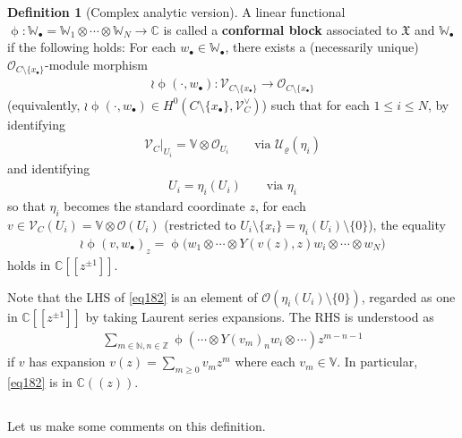 \documentclass[11pt,b5paper,notitlepage]{article}
\theoremstyle{definition}
\newtheorem{df}{Definition}[section]
\theoremstyle{plain}
\newcommand{\fk}{\mathfrak}
\newcommand{\mc}{\mathcal}
\newcommand{\scr}{\mathscr}
\newcommand{\blt}{\bullet}
\newcommand{\Vbb}{\mathbb V}
\newcommand{\Wbb}{\mathbb W}
\newcommand{\Cbb}{\mathbb C}
\newcommand{\Nbb}{\mathbb N}
\newcommand{\Zbb}{\mathbb Z}
\numberwithin{equation}{section}
\begin{document}
\begin{df}[Complex analytic version]\label{lb103}
A linear functional $\upphi:\Wbb_\blt=\Wbb_1\otimes\cdots\otimes\Wbb_N\rightarrow\Cbb$ is called a \textbf{conformal block} associated to $\fk X$ and $\Wbb_\blt$ if the following holds: For each $w_\blt\in\Wbb_\blt$, there exists a (necessarily unique) $\scr O_{C\setminus\{x_\blt\}}$-module morphism
\begin{align*}
\wr\upphi(\cdot,w_\blt):\scr V_{C\setminus\{x_\blt\}}\rightarrow\scr O_{C\setminus\{x_\blt\}}
\end{align*}
(equivalently,  $\wr\upphi(\cdot,w_\blt)\in H^0(C\setminus\{x_\blt\},\scr V_C^\vee)$) such that  for each $1\leq i\leq N$, by identifying
\begin{align}
\scr V_C|_{U_i}=\Vbb\otimes\scr O_{U_i}\qquad\text{via }\mc U_\varrho(\eta_i)\label{eq186}
\end{align}
and identifying
\begin{align}
U_i=\eta_i(U_i)\qquad\text{via }\eta_i	\label{eq187}
\end{align}
so that $\eta_i$ becomes the standard coordinate $z$, for each $v\in \scr V_C(U_i)=\Vbb\otimes\scr O(U_i)$ (restricted to $U_i\setminus\{x_i\}=\eta_i(U_i)\setminus\{0\}$), the equality
\begin{align}
\wr\upphi(v,w_\blt)_z=\upphi\big(w_1\otimes\cdots\otimes Y(v(z),z)w_i\otimes\cdots\otimes w_N\big) \label{eq182}
\end{align}
holds in $\Cbb[[z^{\pm1}]]$. \hfill\qedsymbol
\end{df}


Note that the LHS of \eqref{eq182} is an element of $\scr O(\eta_i(U_i)\setminus\{0\})$, regarded as one in $\Cbb[[z^{\pm1}]]$ by taking Laurent series expansions. The RHS is understood as
\begin{align*}
\sum_{m\in\Nbb,n\in\Zbb}\upphi(\cdots \otimes Y(v_m)_nw_i\otimes\cdots)z^{m-n-1}	
\end{align*}
if $v$ has expansion $v(z)=\sum_{m\geq 0}v_mz^m$ where each $v_m\in\Vbb$. In particular, \eqref{eq182} is in $\Cbb((z))$. 









\subsection{}


Let us make some comments on this definition.
\end{document}
